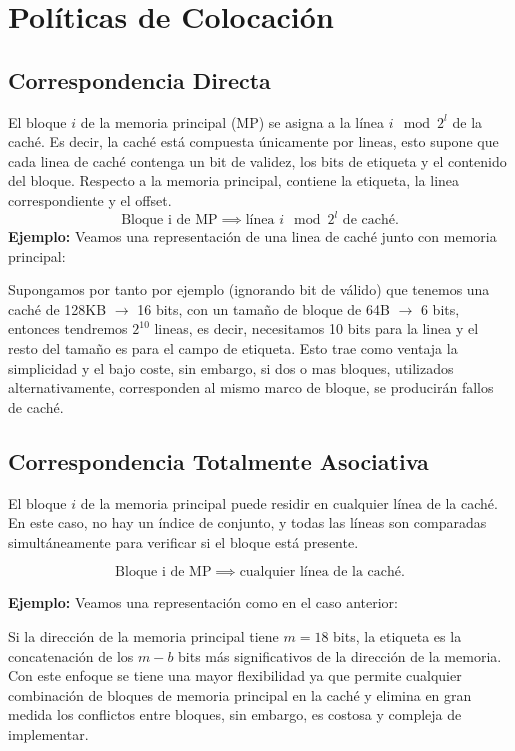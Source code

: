 \section{Políticas de Colocación}
\subsection{Correspondencia Directa}
El bloque \( i \) de la memoria principal (MP) se asigna a la línea \( i \mod 2^l \) de la caché. 
Es decir, la caché está compuesta únicamente por lineas, esto supone que cada linea de caché contenga
un bit de validez, los bits de etiqueta y el contenido del bloque. Respecto a la memoria principal, contiene la etiqueta, 
la linea correspondiente y el offset.
\[
\text{Bloque i de MP} \implies \text{línea } i \mod 2^l \text{ de caché}.
\]
\textbf{Ejemplo:} Veamos una representación de una linea de caché junto con memoria principal:
\begin{center}
    
\end{center}
Supongamos por tanto por ejemplo (ignorando bit de válido) que tenemos una caché de 128KB $\rightarrow$ 16 bits, con un tamaño de bloque de 64B $\rightarrow$ 6 bits, entonces
tendremos $2^10$ lineas, es decir, necesitamos 10 bits para la linea y el resto del tamaño es para el campo de etiqueta.
Esto trae como ventaja la simplicidad y el bajo coste, sin embargo, si dos o mas bloques, utilizados alternativamente, corresponden al mismo marco de bloque, se producirán fallos de caché.

\subsection{Correspondencia Totalmente Asociativa}
El bloque \( i \) de la memoria principal puede residir en cualquier línea de la caché. En este caso, no hay un índice de conjunto, y todas las líneas son comparadas simultáneamente para verificar si el bloque está presente.

\[
\text{Bloque i de MP} \implies \text{cualquier línea de la caché}.
\]

\textbf{Ejemplo:} Veamos una representación como en el caso anterior:
\begin{center}
    
\end{center}
Si la dirección de la memoria principal tiene \( m = 18 \) bits, la etiqueta es la concatenación de los \( m-b \) bits más significativos de la dirección de la memoria.
Con este enfoque se tiene una mayor flexibilidad ya que permite cualquier combinación de bloques de memoria principal en la caché y elimina en gran medida los conflictos entre bloques, sin embargo,
es costosa y compleja de implementar.

